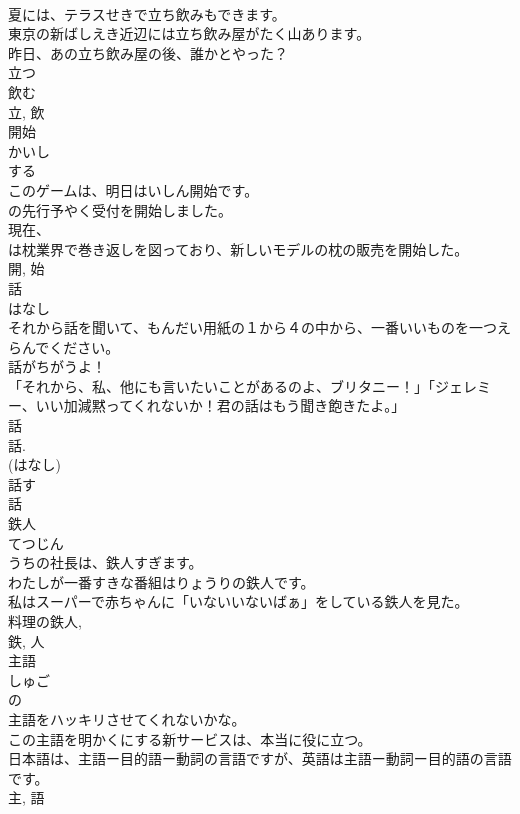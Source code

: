 \documentclass[8pt]{extreport}
\begin{document}
\begin{CJK}{UTF8}{min}
\\	夏には、テラスせきで立ち飲みもできます。	
\\	東京の新ばしえき近辺には立ち飲み屋がたく山あります。	
\\	昨日、あの立ち飲み屋の後、誰かとやった？	
\\	立つ 
\\	飲む 
\\	立, 飲	
\\	開始	
\\	かいし	
\\	する 
\\	このゲームは、明日はいしん開始です。	
\\	の先行予やく受付を開始しました。	
\\	現在、
\\	は枕業界で巻き返しを図っており、新しいモデルの枕の販売を開始した。	
\\	開, 始	
\\	話	
\\	はなし	
\\	それから話を聞いて、もんだい用紙の１から４の中から、一番いいものを一つえらんでください。	
\\	話がちがうよ！	
\\	「それから、私、他にも言いたいことがあるのよ、ブリタニー！」「ジェレミー、いい加減黙ってくれないか！君の話はもう聞き飽きたよ。」	
\\	話 
\\	話.	
\\	(はなし) 
\\	話す
\\	話	
\\	鉄人	
\\	てつじん	
\\	うちの社長は、鉄人すぎます。	
\\	わたしが一番すきな番組はりょうりの鉄人です。	
\\	私はスーパーで赤ちゃんに「いないいないばぁ」をしている鉄人を見た。	
\\	料理の鉄人, 
\\	鉄, 人	
\\	主語	
\\	しゅご	
\\	の 
\\	主語をハッキリさせてくれないかな。	
\\	この主語を明かくにする新サービスは、本当に役に立つ。	
\\	日本語は、主語ー目的語ー動詞の言語ですが、英語は主語ー動詞ー目的語の言語です。	
\\	主, 語	

\end{CJK}
\end{document}
